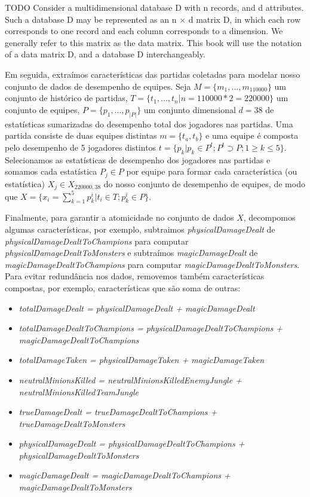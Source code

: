 TODO
Consider a multidimensional database D with n records, and d attributes. Such a database D may be represented as an n × d matrix D, in which each row corresponds to one record and each column corresponds to a dimension. We generally refer to this matrix as the data matrix. This book will use the notation of a data matrix D, and a database D interchangeably.


Em seguida, extraímos características das partidas coletadas para modelar nosso conjunto de dados de desempenho de equipes. Seja $M=\{m_1,...,m_{110000}\}$ um conjunto de histórico de partidas, $T=\{t_1, ..., t_n | n=110000 * 2=220000\}$ um conjunto de equipes, $P=\{p_1, ..., p_{|P|}\}$ um conjunto dimensional $d=38$ de estatísticas sumarizadas do desempenho total dos jogadores nas partidas. Uma partida consiste de duas equipes distintas $m=\{t_a,t_b\}$ e uma equipe é composta pelo desempenho de 5 jogadores distintos $t=\{p_k |  p_k \in P^t; P^t \supset P; 1 \geq k \leq 5\}$. Selecionamos as estatísticas de desempenho dos jogadores nas partidas e somamos cada estatística $P_j \in P$ por equipe para formar cada característica (ou estatística) $X_j \in X_{220000, 38}$ do nosso conjunto de desempenho de equipes, de modo que $X = \{ x_{i} = \sum_{k=1}^{5} p_{k}^{i} | t_{i} \in T; p_{k}^{i} \in P \}$.

Finalmente, para garantir a atomicidade no conjunto de dados $X$, decompomos algumas características, por exemplo, subtraimos \textit{physicalDamageDealt} de \textit{physicalDamageDealtToChampions} para computar \textit{physicalDamageDealtToMonsters} e subtraímos \textit{magicDamageDealt} de \textit{magicDamageDealtToChampions} para computar \textit{magicDamageDealtToMonsters}. Para evitar redundância nos dados, removemos também características compostas, por exemplo, características que são soma de outras:

\begin{itemize}
  \item \textit{totalDamageDealt = physicalDamageDealt + magicDamageDealt}
  \item \textit{totalDamageDealtToChampions = physicalDamageDealtToChampions + magicDamageDealtToChampions}
  \item \textit{totalDamageTaken = physicalDamageTaken + magicDamageTaken}
  \item \textit{neutralMinionsKilled = neutralMinionsKilledEnemyJungle + neutralMinionsKilledTeamJungle}
  \item \textit{trueDamageDealt = trueDamageDealtToChampions + trueDamageDealtToMonsters}
  \item \textit{physicalDamageDealt = physicalDamageDealtToChampions + physicalDamageDealtToMonsters}
  \item \textit{magicDamageDealt = magicDamageDealtToChampions + magicDamageDealtToMonsters}
\end{itemize}

